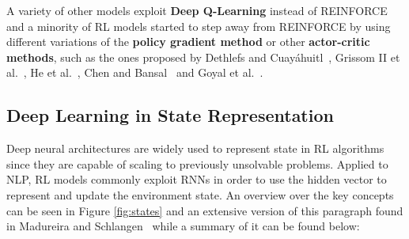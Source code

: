\documentclass[11pt]{article}
\begin{document}
A variety of other models exploit \textbf{Deep Q-Learning} instead of REINFORCE \cite{narasimhan-etal-2016-improving,mosallanezhad-etal-2019-deep,ling-etal-2017-learning} and a minority of RL models started to step away from REINFORCE by using different variations of the \textbf{policy gradient method} \cite{branavan-2009,li-etal-2018-paraphrase,li-etal-2016-deep,le-fokkens-2017-tackling} or other \textbf{actor-critic methods}, such as the ones proposed by Dethlefs and Cuayáhuitl~, Grissom II et al.~, He et al.~, Chen and Bansal~ and Goyal et al.~. 

\subsection{Deep Learning in State Representation}\label{deeplearning}
Deep neural architectures are widely used to represent state in RL algorithms since they are capable of scaling to previously unsolvable problems. Applied to NLP, RL models commonly exploit RNNs in order to use the hidden vector to represent and update the environment state. An overview over the key concepts can be seen in Figure \ref{fig:states} and an extensive version of this paragraph found in Madureira and Schlangen~ while a summary of it can be found below:\\
\end{document}
